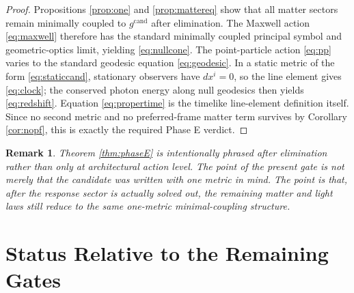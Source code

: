 \documentclass[11pt]{article}
\newcommand{\CandidateMetric}{g^{\mathrm{cand}}}
\newtheorem{remark}{Remark}
\begin{document}
\begin{proof}
Propositions \ref{prop:one} and \ref{prop:mattereq} show that all matter sectors remain minimally coupled to \(\CandidateMetric\) after elimination. The Maxwell action \eqref{eq:maxwell} therefore has the standard minimally coupled principal symbol and geometric-optics limit, yielding \eqref{eq:nullcone}. The point-particle action \eqref{eq:pp} varies to the standard geodesic equation \eqref{eq:geodesic}. In a static metric of the form \eqref{eq:staticcand}, stationary observers have \(dx^i=0\), so the line element gives \eqref{eq:clock}; the conserved photon energy along null geodesics then yields \eqref{eq:redshift}. Equation \eqref{eq:propertime} is the timelike line-element definition itself. Since no second metric and no preferred-frame matter term survives by Corollary \ref{cor:nopf}, this is exactly the required Phase E verdict.
\end{proof}

\begin{remark}
Theorem \ref{thm:phaseE} is intentionally phrased after elimination rather than only at architectural action level. The point of the present gate is not merely that the candidate was written with one metric in mind. The point is that, after the response sector is actually solved out, the remaining matter and light laws still reduce to the same one-metric minimal-coupling structure.
\end{remark}

\section{Status Relative to the Remaining Gates}
\end{document}
